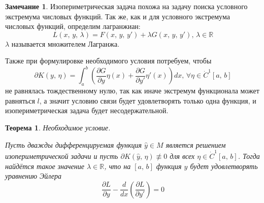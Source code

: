 \documentclass[a4paper,12pt]{article}
\theoremstyle{plain}
\newtheorem{theorem}{Теорема}[section]
\theoremstyle{definition}
\newtheorem*{note}{Замечание}
\theoremstyle{remark}
\begin{document}
\begin{note}
	Изопериметрическая задача похожа на задачу поиска условного экстремума числовых функций. Так же, как и для условного экстремума числовых функций, определим лагранжиан:
	\[L(x,\,y,\,\lambda) = F(x,\,y,\,y') + \lambda G(x,\,y,\,y'),\, \lambda \in \mathbb{R}\]
	$\lambda$ называется множителем Лагранжа.

	Также при формулировке необходимого условия потребуем, чтобы
	\[\partial K(y,\,\eta) = \int_a^b \left(\frac{\partial G}{\partial y}\eta(x) + \frac{\partial G}{\partial y'}\eta'(x)\right)dx,\, \forall \eta \in \dot{C}^1[a,\,b]\]
	не равнялась тождественному нулю, так как иначе экстремум функционала может равняться $l$, а значит условию связи будет удовлетворять только одна функция, и изопериметрическая задача будет несодержательной.
\end{note}

\begin{theorem}
	Необходимое условие.

	Пусть дважды дифференцируемая функция $\hat{y} \in M$ является решением изопериметрической задачи и пусть $\partial K(\hat{y},\, \eta) \not\equiv 0$ для всех $\eta \in \dot{C}^1[a,\,b]$. Тогда найдётся такое значение $\lambda \in \mathbb{R}$, что на $[a,\,b]$ функция $\hat{y}$ будет удовлетворять уравнению Эйлера
	\[\frac{\partial L}{\partial y} - \frac{d}{dx}\left(\frac{\partial L}{\partial y'}\right) = 0\]
\end{theorem}
\end{document}
